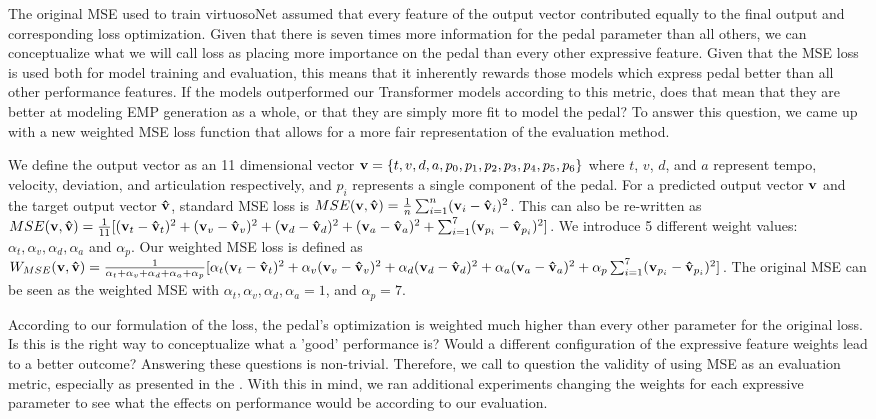 The original MSE used to train virtuosoNet assumed that every feature of the output vector contributed equally to the final output and corresponding loss optimization. Given that there is seven times more information for the pedal parameter than all others, we can conceptualize what we will call \vnetf{} loss as placing more importance on the pedal than every other expressive feature. Given that the \vnetf{} MSE loss is used both for model training and evaluation, this means that it inherently rewards those models which express pedal better than all other performance features. If the \vnet{} models outperformed our Transformer models according to this metric, does that mean that they are better at modeling EMP generation as a whole, or that they are simply more fit to model the pedal? To answer this question, we came up with a new weighted MSE loss function that allows for a more fair representation of the evaluation method. 

\newcommand{\rvec}[1]{\mb{#1}}

\newcommand{\vn}{\rvec{v}}
\newcommand{\vh}{\rvec{\hat{v}}}

\newcommand{\df}[1]{(\vn_{#1} - \vh_{#1})^2}

\newcommand{\al}[1]{\alpha_{#1}}

We define the output vector as an 11 dimensional vector $\rvec{v} = \{t, v, d, a, p_0, p_1, p_2, p_3, p_4, p_5, p_6\}$ where $t$, $v$, $d$, and $a$ represent tempo, velocity, deviation, and articulation respectively, and $p_i$ represents a single component of the pedal. For a predicted output vector $\vn$ and the target output vector $\vh$, standard MSE loss is $MSE(\vn, \vh) = \frac{1}{n}\sum_{i=1}^{n}(\vn_i - \vh_i)^2$. This can also be re-written as $MSE(\vn, \vh) = \frac{1}{11}[\df{t} + \df{v} + \df{d} + \df{a} + \sum_{i=1}^{7}(\vn_{p_{i}} - \vh_{p_{i}})^2]$. We introduce 5 different weight values: $\al{t}, \al{v}, \al{d}, \al{a}$ and $\al{p}$. Our weighted MSE loss is defined as $W_{MSE}(\vn, \vh) = \frac{1}{\al{t} + \al{v} + \al{d} + \al{a} + \al{p}}[\al{t}\df{t} + \al{v}\df{v} + \al{d}\df{d} + \al{a}\df{a} + \al{p}\sum_{i=1}^{7}(\vn_{p_{i}} - \vh_{p_{i}})^2 ]$. The original MSE can be seen as the weighted MSE with $\al{t}, \al{v}, \al{d}, \al{a} = 1$, and $\al{p} = 7$. 

According to our formulation of the loss, the pedal's optimization is weighted much higher than every other parameter for the original \vnetf{} loss. Is this is the right way to conceptualize what a 'good' performance is? Would a different configuration of the expressive feature weights lead to a better outcome? Answering these questions is non-trivial. Therefore, we call to question the validity of using MSE as an evaluation metric, especially as presented in the \vnetf{}. With this in mind, we ran additional experiments changing the weights for each expressive parameter to see what the effects on performance would be according to our evaluation. 


